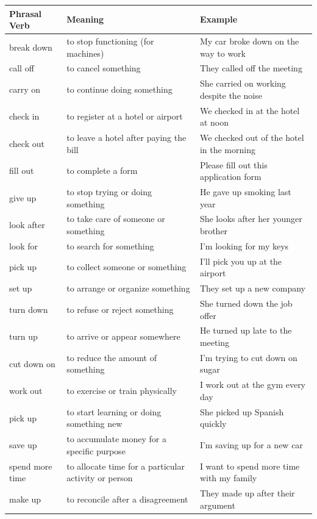 \begin{longtable}{p{}p{}p{}}
\textbf{Phrasal Verb} & \textbf{Meaning} & \textbf{Example} \\
\hline
\endhead
break down & to stop functioning (for machines) & My car broke down on the way to work \\
\hline
call off & to cancel something & They called off the meeting \\
\hline
carry on & to continue doing something & She carried on working despite the noise \\
\hline
check in & to register at a hotel or airport & We checked in at the hotel at noon \\
\hline
check out & to leave a hotel after paying the bill & We checked out of the hotel in the morning \\
\hline
fill out & to complete a form & Please fill out this application form \\
\hline
give up & to stop trying or doing something & He gave up smoking last year \\
\hline
look after & to take care of someone or something & She looks after her younger brother \\
\hline
look for & to search for something & I'm looking for my keys \\
\hline
pick up & to collect someone or something & I'll pick you up at the airport \\
\hline
set up & to arrange or organize something & They set up a new company \\
\hline
turn down & to refuse or reject something & She turned down the job offer \\
\hline
turn up & to arrive or appear somewhere & He turned up late to the meeting \\
\hline
cut down on & to reduce the amount of something & I'm trying to cut down on sugar \\
\hline
work out & to exercise or train physically & I work out at the gym every day \\
\hline
pick up & to start learning or doing something new & She picked up Spanish quickly \\
\hline
save up & to accumulate money for a specific purpose & I'm saving up for a new car \\
\hline
spend more time & to allocate time for a particular activity or person & I want to spend more time with my family \\
\hline
make up & to reconcile after a disagreement & They made up after their argument \\

\end{longtable}
